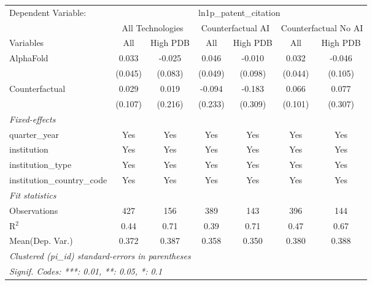 \begingroup
\centering
\begin{tabular}{lcccccc}
   \tabularnewline \midrule \midrule
   Dependent Variable: & \multicolumn{6}{c}{ln1p\_patent\_citation}\\
 & \multicolumn{2}{c}{All Technologies} & \multicolumn{2}{c}{Counterfactual AI} & \multicolumn{2}{c}{Counterfactual No AI} \\
\cmidrule(lr){1-1}\cmidrule(lr){2-3} \cmidrule(lr){4-5} \cmidrule(lr){6-7}
Variables & \multicolumn{1}{c}{All} & \multicolumn{1}{c}{High PDB} & \multicolumn{1}{c}{All} & \multicolumn{1}{c}{High PDB} & \multicolumn{1}{c}{All} & \multicolumn{1}{c}{High PDB} \\
\cmidrule(lr){1-1}\cmidrule(lr){2-2} \cmidrule(lr){3-3} \cmidrule(lr){4-4} \cmidrule(lr){5-5} \cmidrule(lr){6-6} \cmidrule(lr){7-7}
   AlphaFold                    & 0.033   & -0.025  & 0.046   & -0.010  & 0.032   & -0.046\\   
                                & (0.045) & (0.083) & (0.049) & (0.098) & (0.044) & (0.105)\\   
   Counterfactual               & 0.029   & 0.019   & -0.094  & -0.183  & 0.066   & 0.077\\   
                                & (0.107) & (0.216) & (0.233) & (0.309) & (0.101) & (0.307)\\   
   \midrule
   \emph{Fixed-effects}\\
   quarter\_year                & Yes     & Yes     & Yes     & Yes     & Yes     & Yes\\  
   institution                  & Yes     & Yes     & Yes     & Yes     & Yes     & Yes\\  
   institution\_type            & Yes     & Yes     & Yes     & Yes     & Yes     & Yes\\  
   institution\_country\_code   & Yes     & Yes     & Yes     & Yes     & Yes     & Yes\\  
   \midrule
   \emph{Fit statistics}\\
   Observations                 & 427     & 156     & 389     & 143     & 396     & 144\\  
   R$^2$                        & 0.44    & 0.71    & 0.39    & 0.71    & 0.47    & 0.67\\  
Mean(Dep. Var.) & 0.372 & 0.387 & 0.358 & 0.350 & 0.380 & 0.388 \\
   \midrule \midrule
   \multicolumn{7}{l}{\emph{Clustered (pi\_id) standard-errors in parentheses}}\\
   \multicolumn{7}{l}{\emph{Signif. Codes: ***: 0.01, **: 0.05, *: 0.1}}\\
\end{tabular}
\par\endgroup
